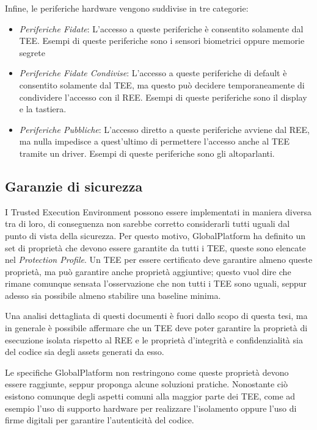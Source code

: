 \documentclass[12pt,italian]{report}
\begin{document}
\noindent Infine, le periferiche hardware vengono suddivise in tre categorie:
\begin{itemize}
    \item \textit{Periferiche Fidate}: L'accesso a queste periferiche è
    consentito solamente dal TEE. Esempi di queste periferiche sono i
    sensori biometrici oppure memorie segrete %
    \item \textit{Periferiche Fidate Condivise}: L'accesso a queste
    periferiche di default è consentito solamente dal TEE, ma questo può
    decidere temporaneamente di condividere l'accesso con il REE. Esempi di
    queste periferiche sono il display e la tastiera.
    \item \textit{Periferiche Pubbliche}: L'accesso diretto a queste
    periferiche avviene dal REE, ma nulla impedisce a quest'ultimo di
    permettere l'accesso anche al TEE tramite un driver. Esempi di queste
    periferiche sono gli altoparlanti.
\end{itemize}

\subsection{Garanzie di sicurezza}
\label{subsec:garanzie-sicurezza}
I Trusted Execution Environment possono essere implementati in maniera
diversa tra di loro, di conseguenza non sarebbe corretto considerarli tutti
uguali dal punto di vista della sicurezza.
Per questo motivo, GlobalPlatform ha definito un set di proprietà che
devono essere garantite da tutti i TEE, queste sono elencate nel
\textit{Protection Profile}\cite{gp2020protectionprofile}.
Un TEE per essere certificato deve garantire almeno queste proprietà, ma
può garantire anche proprietà aggiuntive; questo vuol dire che rimane
comunque sensata l'osservazione che non tutti i TEE sono uguali, seppur
adesso sia possibile almeno stabilire una baseline minima. 

Una analisi dettagliata di questi documenti è fuori dallo scopo di questa
tesi, ma in generale è possibile affermare che un TEE deve poter garantire
la proprietà di esecuzione isolata rispetto al REE e le proprietà d'integrità
e confidenzialità sia del codice sia degli assets generati da esso.

Le specifiche GlobalPlatform non restringono come queste proprietà devono
essere raggiunte, seppur proponga alcune soluzioni pratiche.
Nonostante ciò esistono comunque degli aspetti comuni alla maggior parte dei
TEE, come ad esempio l'uso di supporto hardware per realizzare l'isolamento
oppure l'uso di firme digitali per garantire l'autenticità del codice.
\end{document}
